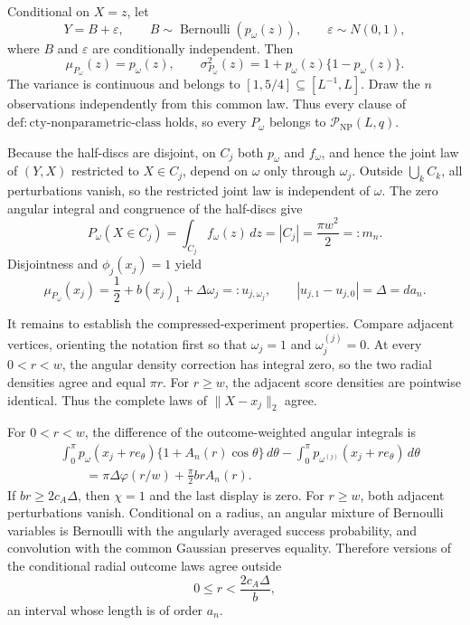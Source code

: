 Conditional on \(X=z\), let
\[
 Y=B+\varepsilon,
 \qquad
 B\sim\operatorname{Bernoulli}(p_\omega(z)),
 \qquad
 \varepsilon\sim N(0,1),
\]
where \(B\) and \(\varepsilon\) are conditionally independent.  Then
\[
 \mu_{P_\omega}(z)=p_\omega(z),
 \qquad
 \sigma_{P_\omega}^2(z)=1+p_\omega(z)\{1-p_\omega(z)\}.
\]
The variance is continuous and belongs to \([1,5/4]\subseteq[L^{-1},L]\).  Draw the \(n\) observations independently from this common law.  Thus every clause of \(\mathrm{def:cty\text{-}nonparametric\text{-}class}\) holds, so every \(P_\omega\) belongs to \(\mathcal P_{\mathrm{NP}}(L,q)\).

Because the half-discs are disjoint, on \(C_j\) both \(p_\omega\) and \(f_\omega\), and hence the joint law of \((Y,X)\) restricted to \(X\in C_j\), depend on \(\omega\) only through \(\omega_j\).  Outside \(\bigcup_k C_k\), all perturbations vanish, so the restricted joint law is independent of \(\omega\).  The zero angular integral and congruence of the half-discs give
\[
 P_\omega(X\in C_j)=\int_{C_j}f_\omega(z)\,dz
 =|C_j|=\frac{\pi w^2}{2}=:m_n.
\]
Disjointness and \(\phi_j(x_j)=1\) yield
\[
 \mu_{P_\omega}(x_j)=\frac12+b(x_j)_1+\Delta\omega_j
 =:u_{j,\omega_j},
 \qquad |u_{j,1}-u_{j,0}|=\Delta=d a_n.
\]

It remains to establish the compressed-experiment properties.  Compare adjacent vertices, orienting the notation first so that \(\omega_j=1\) and \(\omega_j^{(j)}=0\).  At every \(0<r<w\), the angular density correction has integral zero, so the two radial densities agree and equal \(\pi r\).  For \(r\geq w\), the adjacent score densities are pointwise identical.  Thus the complete laws of \(\lVert X-x_j\rVert_2\) agree.

For \(0<r<w\), the difference of the outcome-weighted angular integrals is
\[
\begin{aligned}
 &\int_0^\pi p_\omega(x_j+re_\theta)
 \{1+A_n(r)\cos\theta\}\,d\theta
 -\int_0^\pi p_{\omega^{(j)}}(x_j+re_\theta)\,d\theta\\
 &\qquad=\pi\Delta\varphi(r/w)+\frac\pi2brA_n(r).
\end{aligned}
\]
If \(br\geq2c_A\Delta\), then \(\chi=1\) and the last display is zero.  For \(r\geq w\), both adjacent perturbations vanish.  Conditional on a radius, an angular mixture of Bernoulli variables is Bernoulli with the angularly averaged success probability, and convolution with the common Gaussian preserves equality.  Therefore versions of the conditional radial outcome laws agree outside
\[
 0\leq r<\frac{2c_A\Delta}{b},
\]
an interval whose length is of order \(a_n\).

